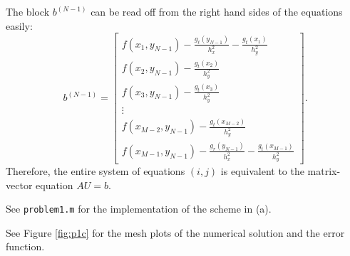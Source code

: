 \documentclass{homework}
\begin{document}
\begin{alphaparts}
\begin{equation*}
		\end{equation*}
		The block $b^{(N-1)}$ can be read off from the right hand sides of the equations easily:
		\begin{equation*}
			b^{(N-1)} = \left[\begin{matrix}
				f(x_1,y_{N-1}) - \frac{g_\ell(y_{N-1})}{h_x^2} - \frac{g_t(x_1)}{h_y^2} \\
				f(x_2,y_{N-1}) - \frac{g_t(x_2)}{h_y^2} \\
				f(x_3,y_{N-1}) - \frac{g_t(x_3)}{h_y^2} \\
				\vdots \\
				f(x_{M-2},y_{N-1}) - \frac{g_t(x_{M-2})}{h_y^2}\\
				f(x_{M-1},y_{N-1}) - \frac{g_r(y_{N-1})}{h_x^2} - \frac{g_t(x_{M-1})}{h_y^2}
			\end{matrix}\right].
		\end{equation*}
		Therefore, the entire system of equations $(i,j)$ is equivalent to the matrix-vector equation $AU = b$.
		
		\questionpart See \texttt{problem1.m} for the implementation of the scheme in (a).
		
		\questionpart See Figure \ref{fig:p1c} for the mesh plots of the numerical solution and the error function.
		

\end{alphaparts}
\end{document}
